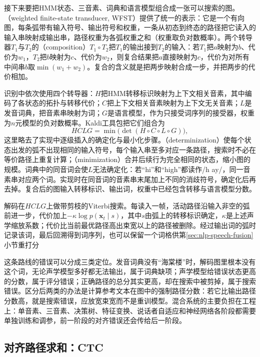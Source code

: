 接下来要把HMM状态、三音素、词典和语言模型组合成一张可以搜索的图。（weighted finite-state transducer, WFST）提供了统一的表示：它是一个有向图，每条弧带有输入符号、输出符号和权重，一条从初态到终态的路径把它读入的输入串映射成输出串，路径权重为各弧权重之和（权重取负对数概率）。两个转导器$T_1$与$T_2$的（composition）$T_1\circ T_2$把$T_1$的输出接到$T_2$的输入：若$T_1$把$a$映射为$b$、代价为$w_1$，$T_2$把$b$映射为$c$、代价为$w_2$，则复合结果把$a$直接映射为$c$，代价为对所有中间串$b$取$\min(w_1+w_2)$。复合的含义就是把两步映射合成一步，并把两步的代价相加。

识别中依次使用四个转导器：$H$把HMM转移标识映射为上下文相关音素，其中编码了各状态的拓扑与转移代价；$C$把上下文相关音素映射为上下文无关音素；$L$是发音词典，把音素串映射为词；$G$是语言模型，作为只接受词序列的接受器，权重为$n$元模型的负对数概率。Kaldi工具包把它们组合为
\begin{equation}
 \mathit{HCLG}=\min\bigl(\det(H\circ C\circ L\circ G)\bigr),
 \label{eq:nlp-speech-hclg}
\end{equation}
这里略去了实现中逐级插入的确定化与最小化步骤。（determinization）使每个状态出发的弧不出现相同的输入符号，每个输入串至多对应一条路径，搜索时不必在等价路径上重复计算；（minimization）合并后续行为完全相同的状态，缩小图的规模。词典中的同音词会使$L$无法确定化：若“hi”和“high”都读作/h ay/，同一音素串对应两个词。实现时在同音词的音素串末尾加上不同的消歧符号，确定化后再去掉。复合后的图输入转移标识、输出词，权重中已经包含转移与语言模型分数。

解码在$\mathit{HCLG}$上做带剪枝的Viterbi搜索。每读入一帧，活动路径沿输入非空的弧前进一步，代价加上$-\kappa\log p(\bm{x}_t\mid s)$，其中$s$由弧上的转移标识确定，$\kappa$是上述声学缩放系数；代价比当前最优路径高出束宽以上的路径被删除。经过输出词的弧时记录该词，最后回溯得到词序列，也可以保留一个词格供第\ref{sec:nlp-speech-fusion}小节重打分

这条路线的错误可以分成三类定位。发音词典没有“海棠楼”时，解码图里根本没有这个词，无论声学模型多好都无法输出，属于词典缺项；声学模型给错误状态更高的分数，属于评分错误；正确路径的总分其实更高，却在搜索中被剪掉，属于搜索错误。区分后两类的办法是计算参考文本在图中的强制路径分数：若它比输出路径分数高，就是搜索错误，应放宽束宽而不是重训模型。混合系统的主要负担在工程上：单音素、三音素、决策树、特征变换、说话者自适应和神经网络各阶段都需要单独训练和调参，前一阶段的对齐错误还会传给后一阶段。

\subsection{对齐路径求和：CTC}
\label{sec:nlp-speech-ctc}

